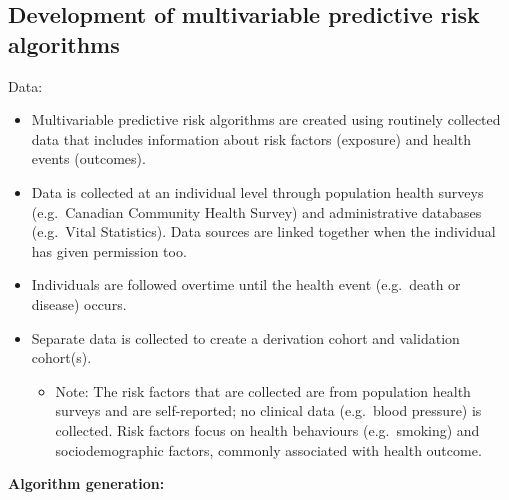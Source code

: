 \documentclass[]{book}
\providecommand{\tightlist}{%
  \setlength{\itemsep}{0pt}\setlength{\parskip}{0pt}}
\begin{document}
\hypertarget{development-of-multivariable-predictive-risk-algorithms}{%
\subsection{Development of multivariable predictive risk algorithms}\label{development-of-multivariable-predictive-risk-algorithms}}

Data:

\begin{itemize}
\item
  Multivariable predictive risk algorithms are created using routinely collected data that includes information about risk factors (exposure) and health events (outcomes).
\item
  Data is collected at an individual level through population health surveys (e.g.~Canadian Community Health Survey) and administrative databases (e.g.~Vital Statistics). Data sources are linked together when the individual has given permission too.
\item
  Individuals are followed overtime until the health event (e.g.~death or disease) occurs.
\item
  Separate data is collected to create a derivation cohort and validation cohort(s).

  \begin{itemize}
  \tightlist
  \item
    Note: The risk factors that are collected are from population health surveys and are self-reported; no clinical data (e.g.~blood pressure) is collected. Risk factors focus on health behaviours (e.g.~smoking) and sociodemographic factors, commonly associated with health outcome.
  \end{itemize}
\end{itemize}

\textbf{Algorithm generation:}
\end{document}
